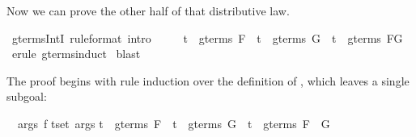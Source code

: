 \begin{isabellebody}
\begin{isamarkuptext}
Now we can prove the other half of that distributive law.%
\end{isamarkuptext}%
\isamarkuptrue%
\isamarkupfalse%
\ gterms{}IntI\ {}rule{}format{}\ intro{}{}{}\isanewline
\ \ \ \ \ {}t\ {}\ gterms\ F\ {}\ t\ {}\ gterms\ G\ {}\ t\ {}\ gterms\ {}F{}G{}{}\isanewline
%
\isadelimproof
%
\endisadelimproof
%
\isatagproof
{}\isamarkupfalse%
\ {}erule\ gterms{}induct{}\isanewline
{}\isamarkupfalse%
\ blast\isanewline
{}\isamarkupfalse%
%
\endisatagproof
{\isafoldproof}%
%
\isadelimproof
%
\endisadelimproof
%
\isadelimproof
%
\endisadelimproof
%
\isatagproof
%
\begin{isamarkuptxt}%
The proof begins with rule induction over the definition of
, which leaves a single subgoal:  
\begin{isabelle}%
\ {}{}\ {}args\ f{}\isanewline
{}t{}set\ args{}\isanewline
{}t\ {}\ gterms\ F\ {}\ {}t\ {}\ gterms\ G\ {}\ t\ {}\ gterms\ {}F\ {}\ G{}{}{}\isanewline

\end{isabelle}
\end{isamarkuptxt}
\end{isabellebody}
